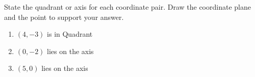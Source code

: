 \documentclass[12pt, letterpaper, fleqn]{article}
\newcommand{\blank}{\underline{\hspace{2.2cm}}}
\begin{document}
\noindent
State the quadrant or axis for each coordinate pair. Draw the coordinate plane and the point to support your answer.

\vspace{3mm}
\begin{enumerate}[itemsep=2.4cm, leftmargin=0.6cm]
\item $(4, -3)$ is in Quadrant \blank

\vspace{2.3cm}

\item $(0, -2)$ lies on the \blank axis

\vspace{2.3cm}

\item $(5, 0)$ lies on the \blank axis

\vspace{2.5cm}

\end{enumerate}
\end{document}
